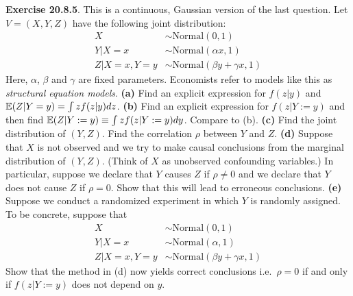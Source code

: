 \textbf{Exercise 20.8.5}. This is a continuous, Gaussian version of the
last question. Let \(V = (X, Y, Z)\) have the following joint
distribution:
\begin{align*}
X &\sim \text{Normal}(0, 1) \\
Y | X = x &\sim \text{Normal}(\alpha x, 1) \\
Z | X = x, Y = y &\sim \text{Normal}(\beta y + \gamma x, 1)
\end{align*}
Here, \(\alpha\), \(\beta\) and \(\gamma\) are fixed parameters.
Economists refer to models like this as \emph{structural equation
models}.
\textbf{(a)} Find an explicit expression for \(f(z | y)\) and
\(\operatorname{\mathbb{E}}(Z | Y = y) = \int z f(z | y) dz\).
\textbf{(b)} Find an explicit expression for \(f(z | Y := y)\) and then
find \(\operatorname{\mathbb{E}}(Z | Y := y) \equiv \int z f(z | Y := y) dy\). Compare
to (b).
\textbf{(c)} Find the joint distribution of \((Y, Z)\). Find the
correlation \(\rho\) between \(Y\) and \(Z\).
\textbf{(d)} Suppose that \(X\) is not observed and we try to make
causal conclusions from the marginal distribution of \((Y, Z)\). (Think
of \(X\) as unobserved confounding variables.) In particular, suppose we
declare that \(Y\) causes \(Z\) if \(\rho \neq 0\) and we declare that
\(Y\) does not cause \(Z\) if \(\rho = 0\). Show that this will lead to
erroneous conclusions.
\textbf{(e)} Suppose we conduct a randomized experiment in which \(Y\)
is randomly assigned. To be concrete, suppose that
\begin{align*}
X &\sim \text{Normal}(0, 1) \\
Y | X = x &\sim \text{Normal}(\alpha, 1) \\
Z | X = x, Y = y &\sim \text{Normal}(\beta y + \gamma x, 1)
\end{align*}
Show that the method in (d) now yields correct conclusions
i.e.~\(\rho = 0\) if and only if \(f(z | Y := y)\) does not depend on
\(y\).

